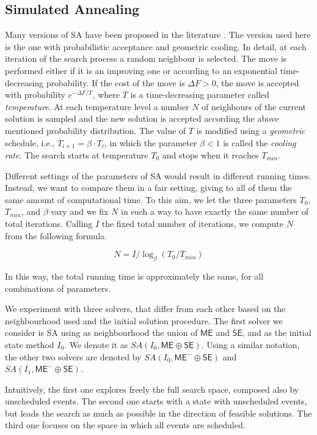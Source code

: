 \documentclass[authoryear,preprint,a4paper,12pt]{elsarticle}
\begin{document}
\subsection{Simulated Annealing}

Many versions of SA have been proposed in the literature \citep[see,
e.g.,][]{KiGV83,Egle90,AaLe97,HoSt05}. The version used here is
the one with probabilistic acceptance and geometric cooling. In detail, at each
iteration of the search process a random neighbour is selected. The
move is performed either if it is an improving one or according to an
exponential time-decreasing probability. If the cost of the
move is $\Delta F > 0$, the move is accepted with probability
$e^{-\Delta F/ T}$, where $T$ is a time-decreasing parameter called
\emph{temperature}. At each temperature level a number $N$ of
neighbours of the current solution is sampled and the new solution is
accepted according the above mentioned probability distribution.  The
value of $T$ is modified using a \emph{geometric} schedule, i.e.,
$T_{i+1} = \beta \cdot T_i$, in which the parameter $\beta < 1$ is called
the \emph{cooling rate}.  The search starts at temperature $T_0$ and
stops when it reaches $T_{min}$.

Different settings of the parameters of SA would result in different
running times. Instead, we want to compare them in a fair
setting, giving to all of them the same amount of computational time.
To this aim, we let the three parameters $T_0$, $T_{min}$, and $\beta$
vary and we fix $N$ in such a way to have exactly the same number of
total iterations. Calling $I$ the fixed total number of
iterations, we compute $N$ from the following formula.

$$N = I / \log_{\beta}{(T_0 / T_{min})} $$

In this way, the total running time is approximately the same, for all
combinations of parameters.

We experiment with three solvers, that differ from each other based on
the neighbourhood used and the initial solution procedure. The first
solver we consider is SA using as neighbourhood the union of
$\mathsf{ME}$ and $\mathsf{SE}$, and  as the initial state method $I_0$.
We denote it as $SA(I_{0}, \mathsf{ME} \oplus \mathsf{SE})$. Using a similar notation, the
other two solvers are denoted by $SA(I_{0}, \mathsf{ME^-}\oplus\mathsf{SE})$ and
$SA(I_{1}, \mathsf{ME^-}\oplus \mathsf{SE})$.

Intuitively, the first one explores freely the full search space,
composed also by unscheduled events. The second one starts with a
state with unscheduled events, but leads the search as much as
possible in the direction of feasible solutions. The third one
focuses on the space in which all events are scheduled.
\end{document}
